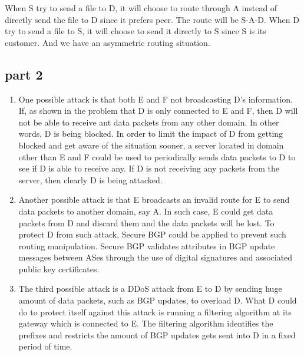 When S try to send a file to D, it will choose to route through A instead of directly send the file to D since it prefers peer. The route will be S-A-D. When D try to send a file to S, it will choose to send it directly to S since S is its customer. And we have an asymmetric routing situation.

\subsection{part 2}

\begin{enumerate}
\item One possible attack is that both E and F not broadcasting D's information. If, as shown in the problem that D is only connected to E and F, then D will not be able to receive ant data packets from any other domain. In other words, D is being blocked. In order to limit the impact of D from getting blocked and get aware of the situation sooner, a server located in domain other than E and F could be used to periodically sends data packets to D to see if D is able to receive any. If D is not receiving any packets from the server, then clearly D is being attacked.
\item Another possible attack is that E broadcasts an invalid route for E to send data packets to another domain, say A. In such case, E could get data packets from D and discard them and the data packets will be lost. To protect D from such attack, Secure BGP could be applied to prevent such routing manipulation. Secure BGP validates attributes in BGP update messages between ASes through the use of digital signatures and associated public key certificates.
\item The third possible attack is a DDoS attack from E to D by sending huge amount of data packets, such as BGP updates, to overload D. What D could do to protect itself against this attack is running a filtering algorithm at its gateway which is connected to E. The filtering algorithm identifies the prefixes and restricts the amount of BGP updates gets sent into D in a fixed period of time.
\end{enumerate}
